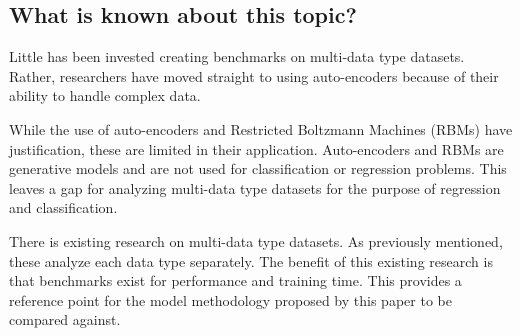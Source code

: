 \subsection{What is known about this topic?}

Little has been invested creating benchmarks on multi-data type datasets.  Rather, researchers have moved straight to using auto-encoders because of their ability to handle complex data.

While the use of auto-encoders and Restricted Boltzmann Machines (RBMs) have justification, these are limited in their application.  Auto-encoders and RBMs are generative models and are not used for classification or regression problems.  This leaves a gap for analyzing multi-data type datasets for the purpose of regression and classification.

There is existing research on multi-data type datasets.  As previously mentioned, these analyze each data type separately.  The benefit of this existing research is that benchmarks exist for performance and training time.  This provides a reference point for the model methodology proposed by this paper to be compared against.  


